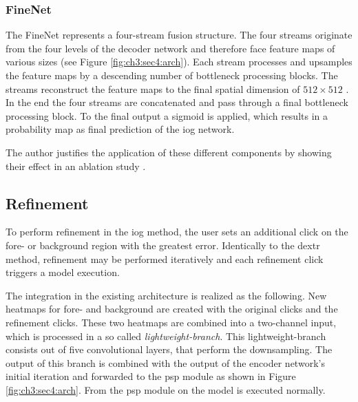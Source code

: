 \subsubsection{FineNet}
The FineNet represents a four-stream fusion structure.
The four streams originate from the four levels of the decoder network and therefore face feature maps of various sizes (see Figure \ref{fig:ch3:sec4:arch}).
Each stream processes and upsamples the feature maps by a descending number of bottleneck processing blocks.
The streams reconstruct the feature maps to the final spatial dimension of $512 \times 512$ .
In the end the four streams are concatenated and pass through a final bottleneck processing block.
To the final output a sigmoid is applied, which results in a probability map as final prediction of the \gls{iog} network.

The author justifies the application of these different components by showing their effect in an ablation study \cite{Zha20-IOG}.


\subsection{Refinement}\label{ord:ch3:sec4:subsec4}

To perform refinement in the \gls{iog} method, the user sets an additional click on the fore- or background region with the greatest error.
Identically to the \gls{dextr} method, refinement may be performed iteratively and each refinement click triggers a model execution.

The integration in the existing architecture is realized as the following.
New heatmaps for fore- and background are created with the original clicks and the refinement clicks.
These two heatmaps are combined into a two-channel input, which is processed in a so called \textit{lightweight-branch}.
This lightweight-branch consists out of five convolutional layers, that perform the downsampling.
The output of this branch is combined with the output of the encoder network's initial iteration and forwarded to the \gls{psp} module as shown in Figure \ref{fig:ch3:sec4:arch}.
From the \gls{psp} module on the model is executed normally.

